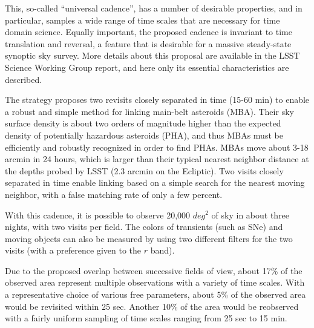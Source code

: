 This, so-called ``universal cadence'', has a number of desirable properties,
and in particular, samples a wide range of time scales that are necessary for
time domain science. Equally important, the proposed cadence is invariant to
time translation and reversal, a feature that is desirable for a massive
steady-state synoptic sky survey. More details about this proposal are available
in the LSST Science Working Group report, and here only its essential
characteristics are described.

The strategy proposes two revisits closely separated in time (15-60 min)
to enable a robust and simple method for linking main-belt asteroids (MBA).
Their sky surface density is about two orders of magnitude higher than the
expected density of potentially hazardous asteroids (PHA), and thus MBAs
must be efficiently and robustly recognized in order to find PHAs. MBAs
move about 3-18 arcmin in 24 hours, which is larger than their typical
nearest neighbor distance at the depths probed by LSST (2.3 arcmin on the
Ecliptic). Two visits closely separated in time enable linking based on
a simple search for the nearest moving neighbor, with a false matching
rate of only a few percent.

With this cadence, it is possible to observe 20,000 $deg^2$ of sky
in about three nights, with two visits per field. The colors of
transients (such as SNe) and moving objects can also be measured by
using two different filters for the two visits (with a preference given
to the $r$ band).

Due to the proposed overlap between successive fields of view, about
17\% of the observed area represent multiple observations with a variety
of time scales. With a representative choice of various free parameters,
about 5\% of the observed area would be revisited within 25 sec.
Another 10\% of the area would be reobserved with a fairly uniform
sampling of time scales ranging from 25 sec to 15 min.

\newpage
{}

\bigskip

